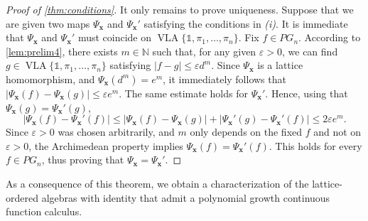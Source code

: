 \documentclass{amsart}
\theoremstyle{plain}
\theoremstyle{definition}
\theoremstyle{remark}
\newcommand\N{\ensuremath{\mathbb{N}}}
\newcommand{\one}{\mathbb{1}}
\newcommand{\VLA}{\operatorname{VLA}}
\newcommand{\Psx}{\Psi_{\bm x}}
\begin{document}
\begin{proof}[Proof of \cref{thm:conditions}]
    It only remains to prove uniqueness.
    Suppose that we are given two maps $\Psx$ and $\Psx'$ satisfying
    the conditions in \textit{(i)}. It is immediate that $\Psx$ and
    $\Psx'$ must coincide on $\VLA\{\one,\pi _1,\ldots ,\pi _n\}$. Fix
    $f \in PG_n$. According to
    \cref{lem:prelim4}, there exists $m \in \N$ such that, for any
    given $\varepsilon >0$, we can find $g \in
    \VLA\{\one,\pi _1,\ldots ,\pi _n\}$ satisfying $|f-g|\le
    \varepsilon d^{m}$. Since $\Psx$ is a lattice homomorphism, and
    $\Psx(d^{m})=e^{m}$, it immediately follows that
    $|\Psx(f)-\Psx(g)|\le \varepsilon e^{m}$. The same estimate holds for
    $\Psx'$. Hence, using that $\Psx(g)=\Psx'(g)$,
    \[
    |\Psx(f)-\Psx'(f)|\le |\Psx(f)-\Psx(g)|+|\Psx'(g)-\Psx'(f)|\le
    2\varepsilon e^{m}.
    \]
    Since $\varepsilon >0$ was chosen arbitrarily, and $m$ only
    depends on the fixed $f$ and not on $\varepsilon >0$, the Archimedean
    property implies $\Psx(f)=\Psx'(f)$. This holds for every $f \in
    PG_n$, thus proving that $\Psx=\Psx'$.
\end{proof}

As a consequence of this theorem, we obtain a characterization of
the lattice-ordered algebras with identity that admit a polynomial growth
continuous function calculus.
\end{document}
